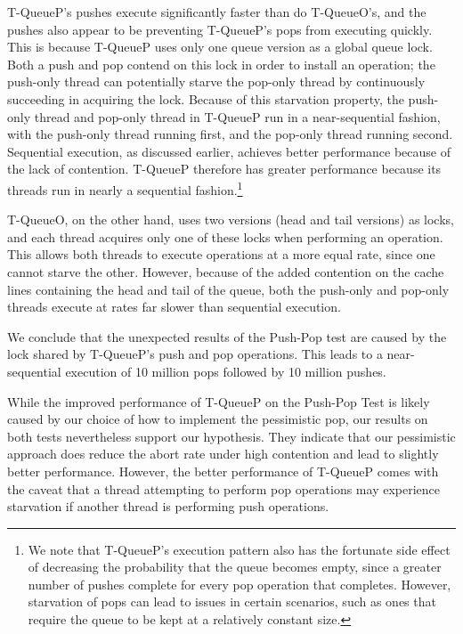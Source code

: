T-QueueP's pushes execute significantly faster than do T-QueueO's, and the pushes also appear to be preventing T-QueueP's pops from executing quickly. This is because T-QueueP uses only one queue version as a global queue lock. Both a push and pop contend on this lock in order to install an operation; the push-only thread can potentially starve the pop-only thread by continuously succeeding in acquiring the lock.
Because of this starvation property, the push-only thread and pop-only thread in T-QueueP run in a near-sequential fashion, with the push-only thread running first, and the pop-only thread running second.
Sequential execution, as discussed earlier, achieves better performance because of the lack of contention.
T-QueueP therefore has greater performance because its threads run in nearly a sequential fashion.\footnote{We note that T-QueueP's execution pattern also has the fortunate side effect of decreasing the probability that the queue becomes empty, since a greater number of pushes complete for every pop operation that completes. However, starvation of pops can lead to issues in certain scenarios, such as ones that require the queue to be kept at a relatively constant size.}

T-QueueO, on the other hand, uses two versions (head and tail versions) as locks, and each thread acquires only one of these locks when performing an operation. This allows both threads to execute operations at a more equal rate, since one cannot starve the other. However, because of the added contention on the cache lines containing the head and tail of the queue, both the push-only and pop-only threads execute at rates far slower than sequential execution.

We conclude that the unexpected results of the Push-Pop test are caused by the lock shared by T-QueueP's push and pop operations. This leads to a near-sequential execution of 10 million pops followed by 10 million pushes. 

While the improved performance of T-QueueP on the Push-Pop Test is likely caused by our choice of how to implement the pessimistic pop, our results on both tests nevertheless support our hypothesis. They indicate that our pessimistic approach does reduce the abort rate under high contention and lead to slightly better performance. However, the better performance of T-QueueP comes with the caveat that a thread attempting to perform pop operations may experience starvation if another thread is performing push operations.

\vspace{12pt}
\noindent{}


